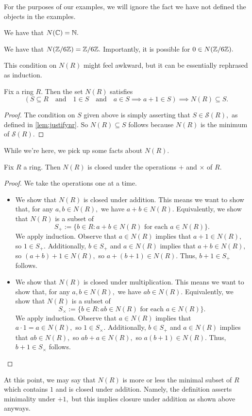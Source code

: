 \documentclass{article}
\begin{document}
For the purposes of our examples, we will ignore the fact we have not defined the objects in the examples.
\begin{example}
	We have that $N(\mathbb C)=\mathbb N.$
\end{example}
\begin{example}
	We have that $N(\mathbb Z/6\mathbb Z)=\mathbb Z/6\mathbb Z.$ Importantly, it is possible for $0\in N(\mathbb Z/6\mathbb Z).$
\end{example}
This condition on $N(R)$ might feel awkward, but it can be essentially rephrased as induction.
\begin{corollary}[Induction]
	Fix a ring $R.$ Then the set $N(R)$ satisfies
	\[(S\subseteq R\quad\text{and}\quad1\in S\quad\text{and}\quad a\in S\implies a+1\in S)\implies N(R)\subseteq S.\]
\end{corollary}
\begin{proof}
	The condition on $S$ given above is simply asserting that $S\in \mathcal S(R),$ as defined in \autoref{lem:justifynr}. So $N(R)\subseteq S$ follows because $N(R)$ is the minimum of $\mathcal S(R).$
\end{proof}
While we're here, we pick up some facts about $N(R).$
\begin{proposition} \label{prop:natclosed}
	Fix $R$ a ring. Then $N(R)$ is closed under the operations $+$ and $\times$ of $R.$
\end{proposition}
\begin{proof}
	We take the operations one at a time.
	\begin{itemize}
		\item We show that $N(R)$ is closed under addition. This means we want to show that, for any $a,b\in N(R),$ we have $a+b\in N(R).$ Equivalently, we show that $N(R)$ is a subset of
		\[S_+:=\{b\in R:a+b\in N(R)\text{ for each }a\in N(R)\}.\]
		We apply induction. Observe that $a\in N(R)$ implies that $a+1\in N(R),$ so $1\in S_+.$ Additionally, $b\in S_+$ and $a\in N(R)$ implies that $a+b\in N(R),$ so $(a+b)+1\in N(R),$ so $a+(b+1)\in N(R).$ Thus, $b+1\in S_+$ follows.
		\item We show that $N(R)$ is closed under multiplication. This means we want to show that, for any $a,b\in N(R),$ we have $ab\in N(R).$ Equivalently, we show that $N(R)$ is a subset of
		\[S_\times:=\{b\in R:ab\in N(R)\text{ for each }a\in N(R)\}.\]
		We apply induction. Observe that $a\in N(R)$ implies that $a\cdot1=a\in N(R),$ so $1\in S_\times.$ Additionally, $b\in S_+$ and $a\in N(R)$ implies that $ab\in N(R),$ so $ab+a\in N(R),$ so $a(b+1)\in N(R).$ Thus, $b+1\in S_\times$ follows.
		\qedhere
	\end{itemize}
\end{proof}
At this point, we may say that $N(R)$ is more or less the minimal subset of $R$ which contains $1$ and is closed under addition. Namely, the definition asserts minimality under $+1,$ but this implies closure under addition as shown above anyways.
\end{document}
